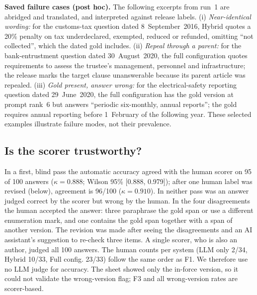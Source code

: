 \documentclass[conference]{IEEEtran}
\newcommand{\sys}[1]{\textsf{#1}}
\begin{document}
\textbf{Saved failure cases (post hoc).} The following excerpts from run~1 are abridged and translated, and interpreted against release labels. (i) \emph{Near-identical wording:} for the customs-tax question dated 8~September~2016, Hybrid quotes a 20\% penalty on tax underdeclared, exempted, reduced or refunded, omitting ``not collected'', which the dated gold includes. (ii) \emph{Repeal through a parent:} for the bank-entrustment question dated 30~August~2020, the full configuration quotes requirements to assess the trustee's management, personnel and infrastructure; the release marks the target clause unanswerable because its parent article was repealed. (iii) \emph{Gold present, answer wrong:} for the electrical-safety reporting question dated 29~June~2020, the full configuration has the gold version at prompt rank~6 but answers ``periodic six-monthly, annual reports''; the gold requires annual reporting before 1~February of the following year. These selected examples illustrate failure modes, not their prevalence.

\subsection{Is the scorer trustworthy?}

In a first, blind pass the automatic accuracy agreed with the human scorer on 95 of 100 answers ($\kappa=0.888$; Wilson 95\% [0.888, 0.979]); after one human label was revised (below), agreement is 96/100 ($\kappa=0.910$). In neither pass was an answer judged correct by the scorer but wrong by the human. In the four disagreements the human accepted the answer: three paraphrase the gold span or use a different enumeration mark, and one contains the gold span together with a span of another version. The revision was made after seeing the disagreements and an AI assistant's suggestion to re-check three items. A single scorer, who is also an author, judged all 100 answers. The human counts per system (\sys{LLM only} 2/34, \sys{Hybrid} 10/33, Full config. 23/33) follow the same order as F1. We therefore use no LLM judge for accuracy. The sheet showed only the in-force version, so it could not validate the wrong-version flag; F3 and all wrong-version rates are scorer-based.
\end{document}

